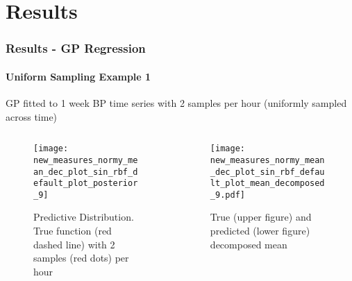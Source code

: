 \documentclass[
	8pt, %
]{beamer}
\begin{document}
%
%
%
%



\section{Results}

\begin{frame}
	\frametitle{Results - GP Regression}
	\framesubtitle{Uniform Sampling Example 1}

	GP fitted to 1 week BP time series with 2 samples per hour (uniformly sampled across time)

	\begin{columns}[c] %
		\begin{column}{0.5\textwidth} %
				\begin{figure}
					\texttt{[image: new\_measures\_normy\_mean\_dec\_plot\_sin\_rbf\_default\_plot\_posterior\_9]}
					\caption{Predictive Distribution. True function (red dashed line) with 2 samples (red dots) per hour}
				\end{figure}
		\end{column}
		\begin{column}{0.5\textwidth} %
				\begin{figure}
					\texttt{[image: new\_measures\_normy\_mean\_dec\_plot\_sin\_rbf\_default\_plot\_mean\_decomposed\_9.pdf]}
					\caption{True (upper figure) and predicted (lower figure) decomposed mean}
				\end{figure}

		\end{column}
	\end{columns}

\end{frame}
\end{document}
